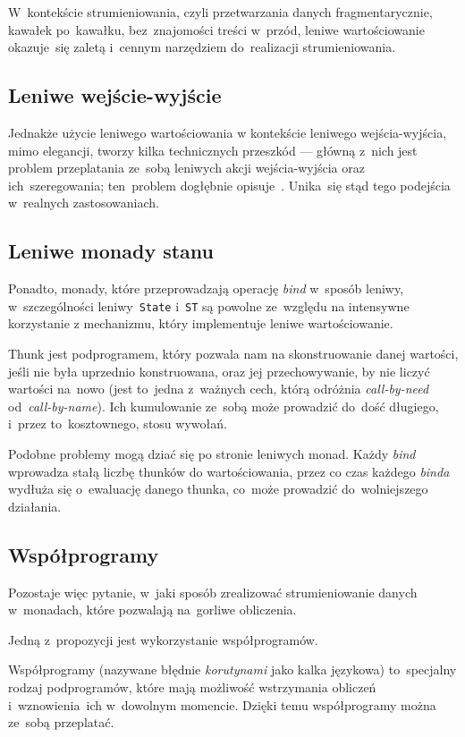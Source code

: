 \documentclass[../../praca.tex]{subfiles}
\begin{document}
W~kontekście strumieniowania, czyli przetwarzania danych fragmentarycznie,
kawałek po~kawałku, bez~znajomości treści w~przód, leniwe wartościowanie okazuje~się
zaletą i~cennym narzędziem do~realizacji strumieniowania.

\subsection{Leniwe wejście-wyjście}

Jednakże użycie leniwego wartościowania w kontekście leniwego wejścia-wyjścia,
mimo elegancji, tworzy kilka technicznych przeszkód --- główną z~nich
jest problem przeplatania ze~sobą leniwych akcji wejścia-wyjścia oraz ich~szeregowania;
ten~problem dogłębnie opisuje~\cite{Thomasson:HHPP}. Unika~się stąd tego podejścia
w~realnych zastosowaniach.

\subsection{Leniwe monady stanu}

Ponadto, monady, które przeprowadzają operację \emph{bind} w~sposób leniwy,
w~szczególności leniwy~\texttt{State} i~\texttt{ST} są powolne ze~względu
na intensywne korzystanie z mechanizmu, który implementuje leniwe wartościowanie.

Thunk jest podprogramem, który pozwala nam na skonstruowanie danej wartości,
jeśli nie była uprzednio konstruowana, oraz jej przechowywanie, by nie
liczyć wartości na~nowo (jest to~jedna z~ważnych cech, którą odróżnia \emph{call-by-need}
od~\emph{call-by-name}). Ich kumulowanie ze~sobą może prowadzić do~dość długiego,
i~przez to~kosztownego, stosu wywołań. 

Podobne problemy mogą dziać się po stronie leniwych monad. Każdy \emph{bind}
wprowadza stałą liczbę thunków do wartościowania, przez co czas każdego \emph{binda}
wydłuża się o~ewaluację danego thunka, co~może prowadzić do~wolniejszego działania.

\subsection{Współprogramy}

Pozostaje więc pytanie, w~jaki sposób zrealizować strumieniowanie danych
w~monadach, które pozwalają na~gorliwe obliczenia.

Jedną z~propozycji jest wykorzystanie współprogramów.

Współprogramy (nazywane błędnie \emph{korutynami} jako kalka językowa)
to~specjalny rodzaj podprogramów, które mają możliwość wstrzymania obliczeń
i~wznowienia~ich w~dowolnym momencie. Dzięki temu współprogramy można ze~sobą
przeplatać.
\end{document}
